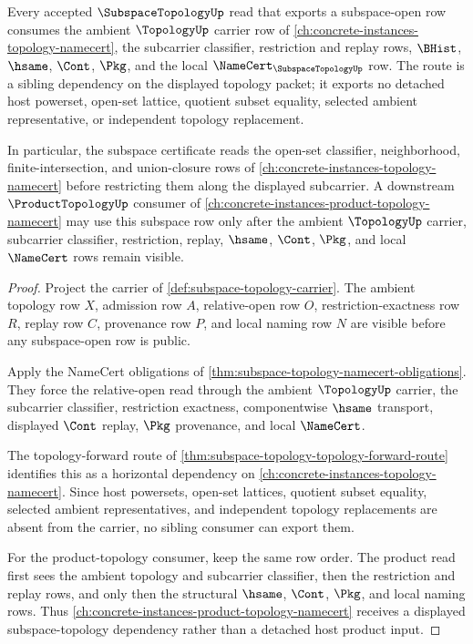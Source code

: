 \begin{theorem}
\label{thm:subspace-topology-topology-sibling-route}
Every accepted $\SubspaceTopologyUp$ read that exports a subspace-open row consumes the ambient $\TopologyUp$ carrier row of \autoref{ch:concrete-instances-topology-namecert}, the subcarrier classifier, restriction and replay rows, $\BHist$, $\hsame$, $\Cont$, $\Pkg$, and the local $\NameCert_{\SubspaceTopologyUp}$ row. The route is a sibling dependency on the displayed topology packet; it exports no detached host powerset, open-set lattice, quotient subset equality, selected ambient representative, or independent topology replacement.

In particular, the subspace certificate reads the open-set classifier, neighborhood, finite-intersection, and union-closure rows of \autoref{ch:concrete-instances-topology-namecert} before restricting them along the displayed subcarrier. A downstream $\ProductTopologyUp$ consumer of \autoref{ch:concrete-instances-product-topology-namecert} may use this subspace row only after the ambient $\TopologyUp$ carrier, subcarrier classifier, restriction, replay, $\hsame$, $\Cont$, $\Pkg$, and local $\NameCert$ rows remain visible.
\end{theorem}
\begin{proof}
Project the carrier of \autoref{def:subspace-topology-carrier}. The ambient topology row $X$, admission row $A$, relative-open row $O$, restriction-exactness row $R$, replay row $C$, provenance row $P$, and local naming row $N$ are visible before any subspace-open row is public.

Apply the NameCert obligations of \autoref{thm:subspace-topology-namecert-obligations}. They force the relative-open read through the ambient $\TopologyUp$ carrier, the subcarrier classifier, restriction exactness, componentwise $\hsame$ transport, displayed $\Cont$ replay, $\Pkg$ provenance, and local $\NameCert$.

The topology-forward route of \autoref{thm:subspace-topology-topology-forward-route} identifies this as a horizontal dependency on \autoref{ch:concrete-instances-topology-namecert}. Since host powersets, open-set lattices, quotient subset equality, selected ambient representatives, and independent topology replacements are absent from the carrier, no sibling consumer can export them.

For the product-topology consumer, keep the same row order. The product read first sees the ambient topology and subcarrier classifier, then the restriction and replay rows, and only then the structural $\hsame$, $\Cont$, $\Pkg$, and local naming rows. Thus \autoref{ch:concrete-instances-product-topology-namecert} receives a displayed subspace-topology dependency rather than a detached host product input.
\end{proof}
